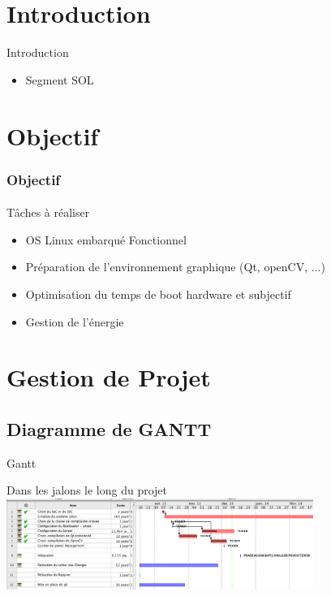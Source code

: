 \documentclass[11pt]{beamer}
\begin{document}
 	\section{Introduction}
	\begin{frame}{Introduction}
		\begin{itemize}
			\item Segment SOL
		\end{itemize}
	\end{frame}

 	\section{Objectif}
	\begin{frame}
		\frametitle{Objectif}
		\framesubtitle{}
	\begin{block}{Tâches à réaliser}
		\begin{itemize}
			\item OS Linux embarqué Fonctionnel
			\item Préparation de l'environnement graphique (Qt, openCV, ...)
			\item Optimisation du temps de boot hardware et subjectif
			\item Gestion de l'énergie
		\end{itemize}
	\end{block}
	\end{frame}
	
	\section{Gestion de Projet}
	\subsection{Diagramme de GANTT}
	\begin{frame}{Gantt}
		\begin{center}
			Dans les jalons le long du projet\\
			\includegraphics[width=10cm]{commons/Gantt.png}
		\end{center}
	\end{frame}
	
\end{document}
